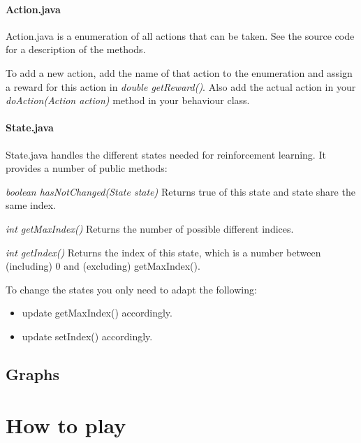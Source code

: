 \documentclass[a4paper,10pt]{scrartcl}
\begin{document}
\paragraph{Action.java}
Action.java is a enumeration of all actions that can be taken. See the source code for a description of the methods. \par

To add a new action, add the name of that action to the enumeration and assign a reward for this action in \textit{double getReward()}. Also add the actual action in your \textit{doAction(Action action)} method in your behaviour class.

\paragraph{State.java}
State.java handles the different states needed for reinforcement learning. It provides a number of public methods: \par

\textit{boolean hasNotChanged(State state)} Returns true of this state and state share the same index. \par

\textit{int getMaxIndex()} Returns the number of possible different indices. \par

\textit{int getIndex()} Returns the index of this state, which is a number between (including) 0 and (excluding) getMaxIndex(). \par

To change the states you only need to adapt the following:
\begin{itemize}
 \item update getMaxIndex() accordingly.
 \item update setIndex() accordingly.
\end{itemize}



\subsection{Graphs}


\section{How to play}
\end{document}
